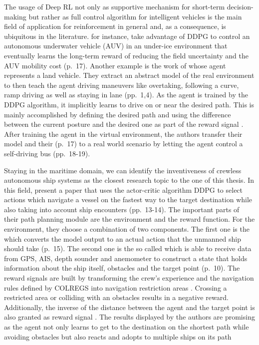\par
The usage of Deep RL not only as supportive mechanism for short-term decision-making but rather as full control algorithm for intelligent vehicles is the main field of application for reinforcement in general and, 
as a consequence, is ubiquitous in the literature. \cite{wang2018reinforcement} for instance, take advantage of DDPG to control an autonomous underwater vehicle (AUV) in an under-ice environment that eventually learns the long-term reward of reducing the field uncertainty and the AUV mobility cost (p.~17). Another example is the work of \cite{s18092905} whose agent represents a land vehicle. They extract an abstract model of the real environment to then teach the agent driving maneuvers like overtaking, following a curve, ramp driving as well as staying in lane (pp.~1,4). As the agent is trained by the DDPG algorithm, it implicitly learns to drive on or near the desired path. This is mainly accomplished by defining the desired path and using the difference between the current posture and the desired one as part of the reward signal \cite[p.~4]{s18092905}. After training the agent in the virtual environment, the authors transfer their model and their  (p.~17) to a real world scenario by letting the agent control a self-driving bus (pp.~18-19).
\par
Staying in the maritime domain, we can identify the inventiveness of crewless autonomous ship systems as the closest research topic to the one of this thesis. In this field, \cite{s20020426} present a paper that uses the actor-critic algorithm DDPG to select actions which navigate a vessel on the fastest way to the target destination while also taking into account ship encounters (pp.~13-14). The important parts of their path planning module are the environment and the reward function. For the environment, they choose a combination of two components. The first one is the  which converts the model output to an actual action that the unmanned ship should take (p.~15). The second one is the so called  which is able to receive data from GPS, AIS, depth sounder and anemometer to construct a state that holds information about the ship itself, obstacles and the target point (p.~10). The reward signals are built by transforming the crew's experience and the navigation rules defined by COLREGS \cite[]{COLREG} into navigation restriction areas \cite[p.~14]{s20020426}. Crossing a restricted area or colliding with an obstacles results in a negative reward. Additionally, the inverse of the distance between the agent and the target point is also granted as reward signal \cite[p.~14]{s20020426}. The results displayed by the authors are promising as the agent not only learns to get to the destination on the shortest path while avoiding obstacles but also reacts and adopts to multiple ships on its path
